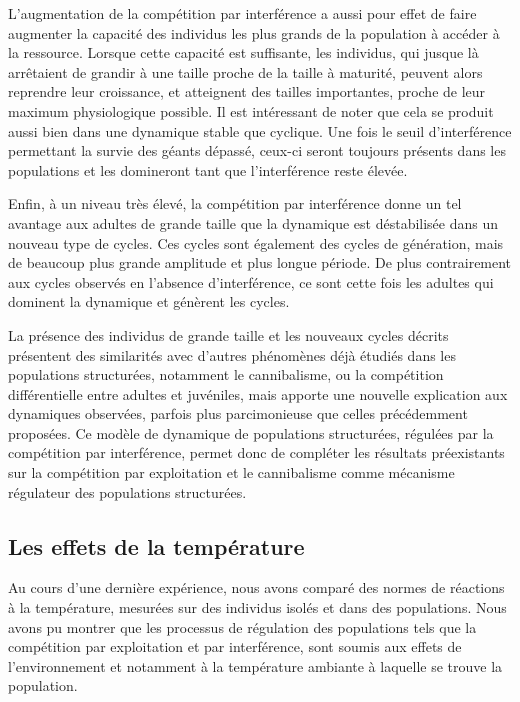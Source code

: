 L'augmentation de la compétition par interférence a aussi pour effet de faire
augmenter la capacité des individus les plus grands de la population à accéder à
la ressource. Lorsque cette capacité est suffisante, les individus, qui jusque
là arrêtaient de grandir à une taille proche de la taille à maturité, peuvent
alors reprendre leur croissance, et atteignent des tailles importantes, proche
de leur maximum physiologique possible. Il est intéressant de noter que cela se
produit aussi bien dans une dynamique stable que cyclique. Une fois le seuil
d'interférence permettant la survie des géants dépassé, ceux-ci seront toujours
présents dans les populations et les domineront tant que l'interférence reste
élevée.

Enfin, à un niveau très élevé, la compétition par interférence donne un tel
avantage aux adultes de grande taille que la dynamique est déstabilisée dans un
nouveau type de cycles. Ces cycles sont également des cycles de génération, mais
de beaucoup plus grande amplitude et plus longue période. De plus contrairement
aux cycles observés en l'absence d'interférence, ce sont cette fois les adultes
qui dominent la dynamique et génèrent les cycles.

La présence des individus de grande taille et les nouveaux cycles décrits
présentent des similarités avec d'autres phénomènes déjà étudiés dans les
populations structurées, notamment le cannibalisme, ou la compétition
différentielle entre adultes et juvéniles, mais apporte une nouvelle explication
aux dynamiques observées, parfois plus parcimonieuse que celles précédemment
proposées. Ce modèle de dynamique de populations structurées, régulées par la
compétition par interférence, permet donc de compléter les résultats
préexistants sur la compétition par exploitation et le cannibalisme comme
mécanisme régulateur des populations structurées.

\subsection{Les effets de la température}

Au cours d'une dernière expérience, nous avons comparé des normes de réactions à
la température, mesurées sur des individus isolés et dans des populations. Nous
avons pu montrer que les processus de régulation des populations tels que la
compétition par exploitation et par interférence, sont soumis aux effets de
l'environnement et notamment à la température ambiante à laquelle se trouve la
population.

